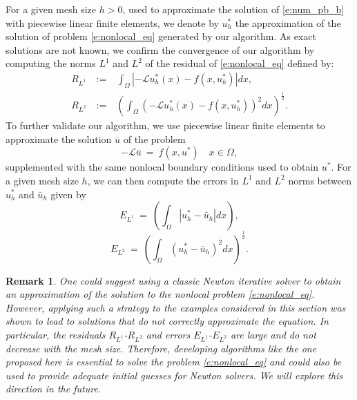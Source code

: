 \documentclass[11pt]{amsart}   	%
\theoremstyle{plain}
\numberwithin{equation}{section}
\newtheorem{remark}[thm]{Remark}
\begin{document}

For a given mesh size $h > 0$, used to approximate the solution of \eqref{e:num_pb_b} with piecewise linear finite elements, we denote by $u_h^*$ the approximation of the solution of problem \eqref{e:nonlocal_eq} generated by our algorithm. As exact solutions are not known, we confirm the convergence of our algorithm by computing the norms $L^1$ and $L^2$ of the residual of \eqref{e:nonlocal_eq} defined by:
$$
\begin{array}{lll}
  R_{L^1}   & \ := \ & \int_\Omega |-\mathcal{L} u_h^*(x) - f(x,u_h^*)| dx ,\\
  R_{L^2}   & \ := \ & \left( \int_\Omega (-\mathcal{L} u_h^*(x) - f(x,u_h^*))^2 dx \right)^{\frac{1}{2}} .
\end{array}
$$
To further validate our algorithm, we use piecewise linear finite elements to approximate the solution $\bar{u}$ of the problem
\begin{equation}\label{e:linear_pb_cvg}
-\mathcal{L} \bar{u}  \ = \   f(x,u^*)  \quad  x \in  \Omega,
\end{equation}
supplemented with the same nonlocal boundary conditions used to obtain $u^*$.
For a given mesh size $h$, we can then compute the errors in $L^1$ and $L^2$ norms between $u_h^*$ and $\bar{u}_h$ given by
$$E_{L^1} \ = \ \left( \int_\Omega |u_h^* - \bar{u}_h | dx \right),$$
$$E_{L^2} \ = \ \left( \int_\Omega (u_h^* - \bar{u}_h )^2 dx \right)^{\frac{1}{2}}.$$

\begin{remark}\label{remark:algo_limitation} One could suggest using a classic Newton iterative solver to obtain an approximation of the solution to the nonlocal problem \ref{e:nonlocal_eq}. However, applying such a strategy to the examples considered in this section was shown to lead to solutions that do not
correctly approximate the equation. In particular, the residuals $R_{L^1}$-$R_{L^2}$ and errors $E_{L^1}$-$E_{L^2}$ are large and do not decrease with the mesh size. Therefore, developing algorithms like the one proposed here is essential to solve the problem \ref{e:nonlocal_eq} and could also be used to provide adequate initial guesses for Newton solvers. We will explore this direction in the future.
\end{remark}
\end{document}
